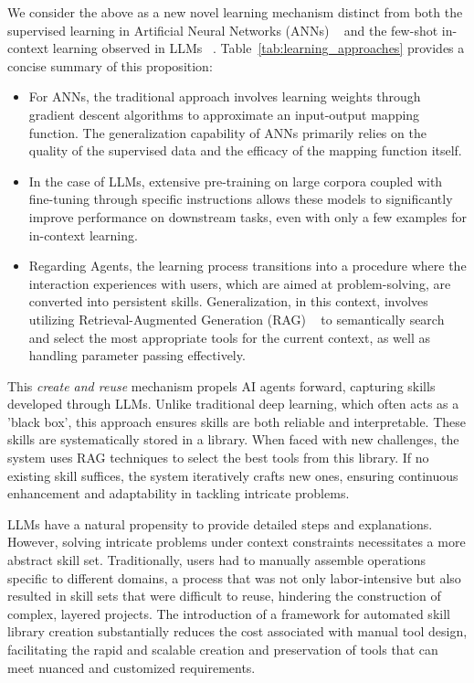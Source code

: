 We consider the above as a new novel learning mechanism distinct from both the supervised learning in Artificial Neural Networks (ANNs) ~\cite{Schmidhuber_2015} and the few-shot in-context learning observed in LLMs ~\cite{dong2023survey}. Table~\ref{tab:learning_approaches} provides a concise summary of this proposition:

\begin{itemize}
    \item For ANNs, the traditional approach involves learning weights through gradient descent algorithms to approximate an input-output mapping function. The generalization capability of ANNs primarily relies on the quality of the supervised data and the efficacy of the mapping function itself.
    \item In the case of LLMs, extensive pre-training on large corpora coupled with fine-tuning through specific instructions allows these models to significantly improve performance on downstream tasks, even with only a few examples for in-context learning.
    \item Regarding Agents, the learning process transitions into a procedure where the interaction experiences with users, which are aimed at problem-solving, are converted into persistent skills. Generalization, in this context, involves utilizing Retrieval-Augmented Generation (RAG) ~\cite{lewis2021retrievalaugmented, li2022survey, mialon2023augmented} to semantically search and select the most appropriate tools for the current context, as well as handling parameter passing effectively.
\end{itemize}

This \textit{create and reuse} mechanism propels AI agents forward, capturing skills developed through LLMs. Unlike traditional deep learning, which often acts as a 'black box', this approach ensures skills are both reliable and interpretable. These skills are systematically stored in a library. When faced with new challenges, the system uses RAG techniques to select the best tools from this library. If no existing skill suffices, the system iteratively crafts new ones, ensuring continuous enhancement and adaptability in tackling intricate problems.

LLMs have a natural propensity to provide detailed steps and explanations. However, solving intricate problems under context constraints necessitates a more abstract skill set. Traditionally, users had to manually assemble operations specific to different domains, a process that was not only labor-intensive but also resulted in skill sets that were difficult to reuse, hindering the construction of complex, layered projects. The introduction of a framework for automated skill library creation substantially reduces the cost associated with manual tool design, facilitating the rapid and scalable creation and preservation of tools that can meet nuanced and customized requirements.

